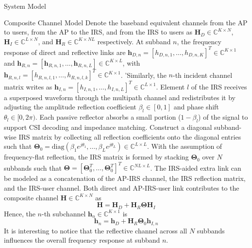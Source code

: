 \documentclass{IEEEtran}
\begin{document}
\begin{section} {System Model}
\begin{subsection}	{Composite Channel Model}
		Denote the baseband equivalent channels from the AP to users, from the AP to the IRS, and from the IRS to users as $\boldsymbol{H}_D \in \mathbb{C}^{K \times N}$, $\boldsymbol{H}_I \in \mathbb{C}^{L \times N}$, and $\boldsymbol{H}_R \in \mathbb{C}^{K \times NL}$ respectively. At subband $n$, the frequency response of direct and reflective links are $\boldsymbol{h}_{D,n}=[h_{D,n,1},\dots,h_{D,n,K}]^T \in \mathbb{C}^{K \times 1}$ and $\boldsymbol{h}_{R,n}=[\boldsymbol{h}_{R,n,1},\dots,\boldsymbol{h}_{R,n,L}] \in \mathbb{C}^{K \times L}$, with $\boldsymbol{h}_{R,n,l}=[h_{R,n,l,1},\dots,h_{R,n,l,k}]^T \in \mathbb{C}^{K \times 1}$. 'Similarly, the $n$-th incident channel matrix writes as $\boldsymbol{h}_{I,n}=[h_{I,n,1},\dots,h_{I,n,L}]^T \in \mathbb{C}^{L \times 1}$. Element $l$ of the IRS receives a superposed waveform through the multipath channel and redistributes it by adjusting the amplitude reflection coefficient $\beta_l \in [0,1]$ and phase shift $\theta_l \in [0,2\pi)$. Each passive reflector absorbs a small portion ($1 - \beta_l$) of the signal to support CSI decoding and impedance matching. Construct a diagonal subband-wise IRS matrix by collecting all reflection coefficients onto the diagonal entries such that $\boldsymbol{\Theta}_0 = \text{diag}(\beta_1 e^{j \theta_1}, \dots, \beta_L e^{j \theta_L}) \in \mathbb{C}^{L \times L}$. With the assumption of frequency-flat reflection, the IRS matrix is formed by stacking $\boldsymbol{\Theta}_0$ over $N$ subbands such that $\boldsymbol{\Theta} = [\boldsymbol{\Theta}_0^T,\dots,\boldsymbol{\Theta}_0^T]^T \in \mathbb{C}^{NL \times L}$. The IRS-aided extra link can be modeled as a concatenation of the AP-IRS channel, the IRS reflection matrix, and the IRS-user channel. Both direct and AP-IRS-user link contributes to the composite channel $\boldsymbol{H} \in \mathbb{C}^{K \times N}$ as
		\begin{equation}	\label{eq:H}
			\boldsymbol{H} = \boldsymbol{H}_D+\boldsymbol{H}_R\boldsymbol{\Theta}\boldsymbol{H}_I
		\end{equation}
		Hence, the $n$-th subchannel $\boldsymbol{h}_n \in \mathbb{C}^{K \times 1}$ is
		\begin{equation}	\label{eq:h_n}
			\boldsymbol{h}_n=\boldsymbol{h}_D+\boldsymbol{H}_{R}\boldsymbol{\Theta}_0\boldsymbol{h}_{I,n}
		\end{equation}
		It is interesting to notice that the reflective channel across all $N$ subbands influences the overall frequency response at subband $n$.
	\end{subsection}


\end{section}
\end{document}
